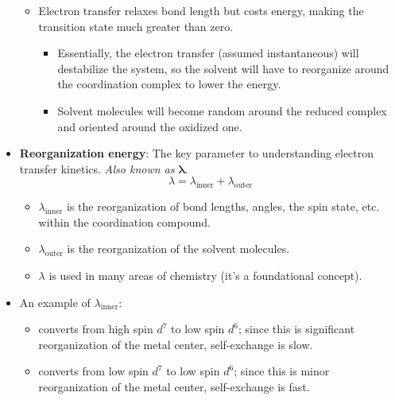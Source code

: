 \documentclass[../notes.tex]{subfiles}
\begin{document}
\begin{itemize}
\begin{itemize}
        \item Electron transfer relaxes bond length but costs energy, making the transition state much greater than zero.
        \begin{itemize}
            \item Essentially, the electron transfer (assumed instantaneous) will destabilize the system, so the solvent will have to reorganize around the coordination complex to lower the energy.
            \item Solvent molecules will become random around the reduced complex and oriented around the oxidized one.
        \end{itemize}
    \end{itemize}
    \item \textbf{Reorganization energy}: The key parameter to understanding electron transfer kinetics. \emph{Also known as} $\bm{\lambda}$.
    \begin{equation*}
        \lambda = \lambda_\text{inner}+\lambda_\text{outer}
    \end{equation*}
    \begin{itemize}
        \item $\lambda_\text{inner}$ is the reorganization of bond lengths, angles, the spin state, etc. within the coordination compound.
        \item $\lambda_\text{outer}$ is the reorganization of the solvent molecules.
        \item $\lambda$ is used in many areas of chemistry (it's a foundational concept).
    \end{itemize}
    \item An example of $\lambda_\text{inner}$:
    \begin{itemize}
        \item {} converts from high spin $d^7$ to low spin $d^6$; since this is significant reorganization of the metal center, self-exchange is slow.
        \item {} converts from low spin $d^7$ to low spin $d^6$; since this is minor reorganization of the metal center, self-exchange is fast.
    \end{itemize}
\end{itemize}
\end{document}
